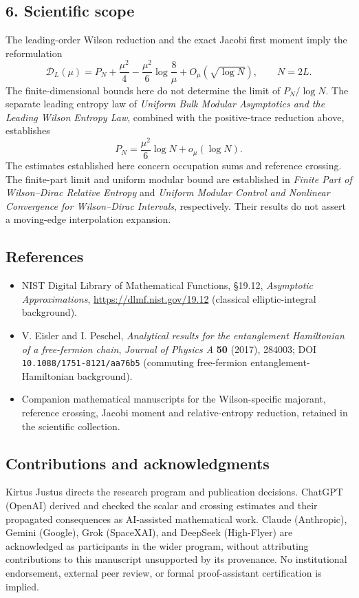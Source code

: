 \documentclass[
  10pt,
  a4paper,
]{article}
\providecommand{\tightlist}{%
  \setlength{\itemsep}{0pt}\setlength{\parskip}{0pt}}
\begin{document}
\subsection{6. Scientific scope}\label{scientific-scope}

The leading-order Wilson reduction and the exact Jacobi first moment imply the reformulation \[
\mathcal D_L(\mu)=P_N+\frac{\mu^2}4-\frac{\mu^2}6\log\frac8\mu
+O_\mu(\sqrt{\log N}),\qquad N=2L.
\] The finite-dimensional bounds here do not determine the limit of \(P_N/\log N\). The separate leading entropy law of \emph{Uniform Bulk Modular Asymptotics and the Leading Wilson Entropy Law}, combined with the positive-trace reduction above, establishes \[
\boxed{P_N=\frac{\mu^2}6\log N+o_\mu(\log N).}
\] The estimates established here concern occupation sums and reference crossing. The finite-part limit and uniform modular bound are established in \emph{Finite Part of Wilson--Dirac Relative Entropy} and \emph{Uniform Modular Control and Nonlinear Convergence for Wilson--Dirac Intervals}, respectively. Their results do not assert a moving-edge interpolation expansion.

\subsection{References}\label{references}

\begin{itemize}
\tightlist
\item
  NIST Digital Library of Mathematical Functions, §19.12, \emph{Asymptotic Approximations}, \url{https://dlmf.nist.gov/19.12} (classical elliptic-integral background).
\item
  V. Eisler and I. Peschel, \emph{Analytical results for the entanglement Hamiltonian of a free-fermion chain}, \emph{Journal of Physics A} \textbf{50} (2017), 284003; DOI \texttt{10.1088/1751-8121/aa76b5} (commuting free-fermion entanglement-Hamiltonian background).
\item
  Companion mathematical manuscripts for the Wilson-specific majorant, reference crossing, Jacobi moment and relative-entropy reduction, retained in the scientific collection.
\end{itemize}

\subsection{Contributions and acknowledgments}\label{contributions-and-acknowledgments}

Kirtus Justus directs the research program and publication decisions. ChatGPT (OpenAI) derived and checked the scalar and crossing estimates and their propagated consequences as AI-assisted mathematical work. Claude (Anthropic), Gemini (Google), Grok (SpaceXAI), and DeepSeek (High-Flyer) are acknowledged as participants in the wider program, without attributing contributions to this manuscript unsupported by its provenance. No institutional endorsement, external peer review, or formal proof-assistant certification is implied.
\end{document}

